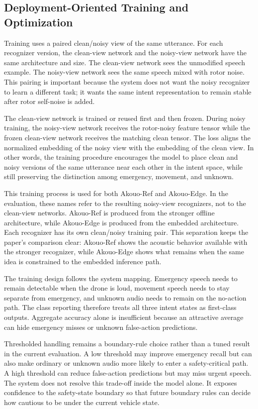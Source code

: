 \subsection{Deployment-Oriented Training and Optimization}

Training uses a paired clean/noisy view of the same utterance. For each recognizer version, the clean-view network and the noisy-view network have the same architecture and size. The clean-view network sees the unmodified speech example. The noisy-view network sees the same speech mixed with rotor noise. This pairing is important because the system does not want the noisy recognizer to learn a different task; it wants the same intent representation to remain stable after rotor self-noise is added.

The clean-view network is trained or reused first and then frozen. During noisy training, the noisy-view network receives the rotor-noisy feature tensor while the frozen clean-view network receives the matching clean tensor. The loss aligns the normalized embedding of the noisy view with the embedding of the clean view. In other words, the training procedure encourages the model to place clean and noisy versions of the same utterance near each other in the intent space, while still preserving the distinction among emergency, movement, and unknown.

This training process is used for both Akouo-Ref and Akouo-Edge. In the evaluation, these names refer to the resulting noisy-view recognizers, not to the clean-view networks. Akouo-Ref is produced from the stronger offline architecture, while Akouo-Edge is produced from the embedded architecture. Each recognizer has its own clean/noisy training pair. This separation keeps the paper's comparison clear: Akouo-Ref shows the acoustic behavior available with the stronger recognizer, while Akouo-Edge shows what remains when the same idea is constrained to the embedded inference path.

The training design follows the system mapping. Emergency speech needs to remain detectable when the drone is loud, movement speech needs to stay separate from emergency, and unknown audio needs to remain on the no-action path. The class reporting therefore treats all three intent states as first-class outputs. Aggregate accuracy alone is insufficient because an attractive average can hide emergency misses or unknown false-action predictions.

Thresholded handling remains a boundary-rule choice rather than a tuned result in the current evaluation. A low threshold may improve emergency recall but can also make ordinary or unknown audio more likely to enter a safety-critical path. A high threshold can reduce false-action predictions but may miss urgent speech. The system does not resolve this trade-off inside the model alone. It exposes confidence to the safety-state boundary so that future boundary rules can decide how cautious to be under the current vehicle state.
